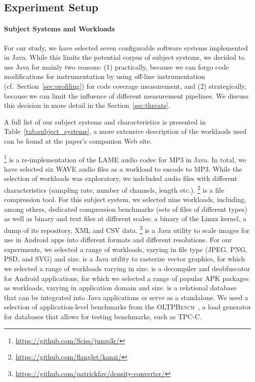 {
	\color{black}
	\subsection{Experiment Setup}\label{sec:setup}
	\paragraph*{Subject Systems and Workloads}
	For our study, we have selected seven configurable software systems implemented in Java. While this limits the potential corpus of subject systems, we decided to use Java for mainly two reasons: (1) practically, because we can forgo code modifications for instrumentation by using off-line instrumentation (cf.~Section~\ref{sec:profiling}) for code coverage measurement, and (2) strategically, because we can limit the influence of different measurement pipelines. We discuss this decision in more detail in the Section~\ref{sec:threats}. 
	
	A full list of our subject systems and characteristics is presented in Table~\ref{tab:subject_systems}, a more extensive description of the worklaods used can be found at the paper's companion Web site.
	
	\jumper\footnote{\url{https://github.com/Sciss/jump3r/}} is a re-implementation of the LAME audio codec for MP3 in Java. In total, we have selected six WAVE audio files as a workload to encode to MP3. While the selection of workloads was exploratory, we indcluded audio files with different characteristics (sampling rate, number of channels, length etc.). 
	\kanzi\footnote{\url{https://github.com/flanglet/kanzi/}} is a file compression tool. For this subject system, we selected nine workloads, including, among others, dedicated compression benchmarks (sets of files of different types) as well as binary and text files at different scales: a binary of the Linux kernel, a dump of its repository, XML and CSV data. 
	\dconvert\footnote{\url{https://github.com/patrickfav/density-converter/}} is a Java utility to scale images for use in Android apps into different formats and different resolutions. For our experiments, we selected a range of workloads, varying in file type (JPEG, PNG, PSD, and SVG) and size.
	\batik is a Java utility to rasterize vector graphics, for which we selected a range of workloads varying in size.
	\jadx is a decompiler and deobfuscator for Android applications, for which we selected a range of popular APK packages as workloads, varying in application domain and size.
	\htwo is a relational database that can be integrated into Java applications or serve as a standalone. We used a selection of application-level benchmarks from the \textsc{OLTPBench}~\cite{difallah_oltp_2013}, a load generator for databases that allows for testing benchmarks, such as \textsc{TPC-C}. 
	
}
